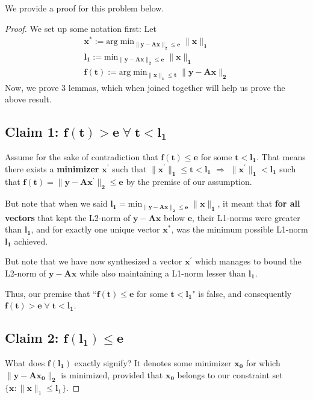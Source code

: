 \documentclass[a4paper,11pt]{article}
\numberwithin{definition}{section}
\numberwithin{mytheorem}{subsection}
\begin{document}
We provide a proof for this problem below.
\begin{proof}
We set up some notation first: Let 
\begin{gather*}
    \boldsymbol{x^*} :=  \mathrm{arg\;min}\boldsymbol{_{\lVert y - Ax\rVert_2 \leq e}\;\lVert x\rVert_1} \\
    \boldsymbol{l_1 := } \mathrm{min}\boldsymbol{_{\lVert y - Ax\rVert_2 \leq e}\;\lVert x\rVert_1} \\
    \boldsymbol{f(t) := } \mathrm{arg\;min}\boldsymbol{_{\lVert x\rVert_1 \leq t}\; \lVert y - Ax\rVert_2} 
\end{gather*}
Now, we prove 3 lemmas, which when joined together will help us prove the above result.
\subsection{Claim 1: $\boldsymbol{f(t) > e}\;\forall\;\boldsymbol{t < l_1}$}
Assume for the sake of contradiction that $\boldsymbol{f(t) \leq e}$ for some $\boldsymbol{t < l_1}$. That means there exists a \textbf{minimizer} $\boldsymbol{x^{\prime}}$ such that $\boldsymbol{\lVert x^{\prime}\rVert_1\leq t < l_1}$ $\Rightarrow$ $\boldsymbol{\lVert x^{\prime}\rVert_1 < l_1}$ such that $\boldsymbol{f(t) = \lVert y - Ax^{\prime}\rVert_2 \leq e}$ by the premise of our assumption.

But note that when we said $\boldsymbol{l_1 = } \mathrm{min}\boldsymbol{_{\lVert y - Ax\rVert_2 \leq e}\;\lVert x\rVert_1}$, it meant that \textbf{for all vectors} that kept the L2-norm of $\boldsymbol{y-Ax}$ below $\boldsymbol{e}$, their L1-norms were greater than $\boldsymbol{l_1}$, and for exactly one unique vector $\boldsymbol{x^*}$, was the minimum possible L1-norm $\boldsymbol{l_1}$ achieved.

But note that we have now synthesized a vector $\boldsymbol{x^{\prime}}$ which manages to bound the L2-norm of $\boldsymbol{y-Ax}$ while also maintaining a L1-norm lesser than $\boldsymbol{l_1}$.

Thus, our premise that ``$\boldsymbol{f(t) \leq e}$ for some $\boldsymbol{t < l_1}$" is false, and consequently $\boldsymbol{f(t) > e}\;\forall\;\boldsymbol{t < l_1}$.


\subsection{Claim 2: $\boldsymbol{f(l_1) \leq e}$}

What does $\boldsymbol{f(l_1)}$ exactly signify? It denotes some minimizer $\boldsymbol{x_0}$ for which $\boldsymbol{\lVert y - Ax_0\rVert_2}$ is minimized, provided that $\boldsymbol{x_0}$ belongs to our constraint set $\{\boldsymbol{x}: \lVert\boldsymbol{x}\rVert_1 \leq \boldsymbol{l_1}\}$. 


\end{proof}
\end{document}
